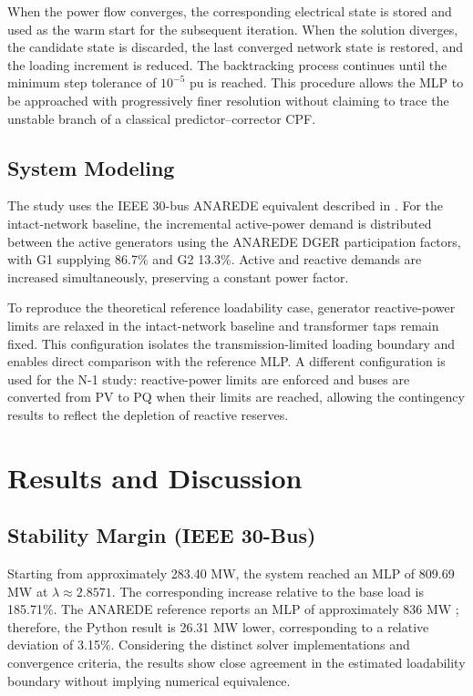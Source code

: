 \documentclass[conference]{IEEEtran}
\begin{document}
When the power flow converges, the corresponding electrical state is stored and used as the warm start for the subsequent iteration. When the solution diverges, the candidate state is discarded, the last converged network state is restored, and the loading increment is reduced. The backtracking process continues until the minimum step tolerance of $10^{-5}$ pu is reached. This procedure allows the MLP to be approached with progressively finer resolution without claiming to trace the unstable branch of a classical predictor--corrector CPF.

\subsection{System Modeling}

The study uses the IEEE 30-bus ANAREDE equivalent described in \cite{madureira2023avaliacao}. For the intact-network baseline, the incremental active-power demand is distributed between the active generators using the ANAREDE DGER participation factors, with G1 supplying 86.7\% and G2 13.3\%. Active and reactive demands are increased simultaneously, preserving a constant power factor.

To reproduce the theoretical reference loadability case, generator reactive-power limits are relaxed in the intact-network baseline and transformer taps remain fixed. This configuration isolates the transmission-limited loading boundary and enables direct comparison with the reference MLP. A different configuration is used for the N-1 study: reactive-power limits are enforced and buses are converted from PV to PQ when their limits are reached, allowing the contingency results to reflect the depletion of reactive reserves.

\section{Results and Discussion}
\label{sec:results}

\subsection{Stability Margin (IEEE 30-Bus)}

Starting from approximately 283.40 MW, the system reached an MLP of 809.69 MW at $\lambda\approx2.8571$. The corresponding increase relative to the base load is 185.71\%. The ANAREDE reference reports an MLP of approximately 836 MW \cite{madureira2023avaliacao}; therefore, the Python result is 26.31 MW lower, corresponding to a relative deviation of 3.15\%. Considering the distinct solver implementations and convergence criteria, the results show close agreement in the estimated loadability boundary without implying numerical equivalence.
\end{document}

